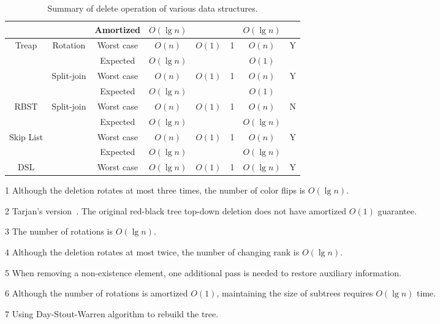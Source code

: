 \begin{table}[!t]
\begin{threeparttable}
\begin{tabular}{cccccccc}
  & & Amortized & $O(\lg n)$ & & & $O(\lg n)$ & \\
  \hline
  \multirow{4}{*}{Treap} & \multirow{2}{*}{Rotation} & Worst case & $O(n)$ & \multirow{2}{*}{$O(1)$} & \multirow{2}{*}{1} & $O(n)$ & \multirow{2}{*}{Y} \\
  & & Expected & $O(\lg n)$ &  & & $O(1)$ & \\
  & \multirow{2}{*}{Split-join} & Worst case & $O(n)$ & \multirow{2}{*}{$O(1)$} & \multirow{2}{*}{1} & $O(n)$ & \multirow{2}{*}{Y} \\
  & & Expected & $O(\lg n)$ & & & $O(1)$ & \\
  \hline
  \multirow{2}{*}{RBST} & \multirow{2}{*}{Split-join}& Worst case & $O(n)$ & \multirow{2}{*}{$O(1)$} & \multirow{2}{*}{1} & $O(n)$ & \multirow{2}{*}{N\tnote{5}} \\
  & & Expected & $O(\lg n)$ &  & & $O(\lg n)$ & \\
  \hline
  \multirow{2}{*}{Skip List} & & Worst case & $O(n)$ & \multirow{2}{*}{$O(1)$} & \multirow{2}{*}{1} & $O(n)$ & \multirow{2}{*}{Y} \\
  & & Expected & $O(\lg n)$ & & & $O(\lg n)$ & \\
  \hline
  DSL & & Worst case & $O(\lg n)$ & $O(1)$ & 1 & $O(\lg n)$ & Y \\
\end{tabular}
\begin{tablenotes}\footnotesize
\item[1] Although the deletion rotates at most three times, the number of color flips is $O(\lg n)$.
\item[2] Tarjan's version~\cite{Tarjan1985}. The original red-black tree top-down deletion does not have amortized $O(1)$ guarantee.
\item[3] The number of rotations is $O(\lg n)$.
\item[4] Although the deletion rotates at most twice, the number of changing rank is $O(\lg n)$.
\item[5] When removing a non-existence element, one additional pass is needed to restore auxiliary information.
\item[6] Although the number of rotations is amortized $O(1)$, maintaining the size of subtrees requires $O(\lg n)$ time.
\item[7] Using Day-Stout-Warren algorithm to rebuild the tree.
\end{tablenotes}
\caption{Summary of delete operation of various data structures.}\label{delete}
\end{threeparttable}
\end{table}

\printbibliography[heading=subbibliography]